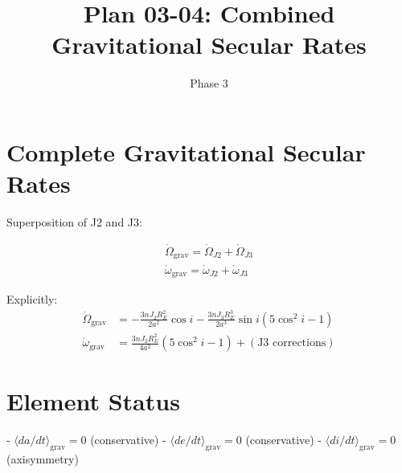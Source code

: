 \documentclass[11pt]{article}
\title{Plan 03-04: Combined Gravitational Secular Rates}
\date{Phase 3}
\begin{document}
\maketitle

\section{Complete Gravitational Secular Rates}

Superposition of J2 and J3:

\begin{align}
\boxed{\dot{\Omega}_{\text{grav}} = \dot{\Omega}_{J2} + \dot{\Omega}_{J3}}\\
\boxed{\dot{\omega}_{\text{grav}} = \dot{\omega}_{J2} + \dot{\omega}_{J3}}
\end{align}

Explicitly:
\begin{align}
\dot{\Omega}_{\text{grav}} &= -\frac{3 n J_2 R_E^2}{2 a^2}\cos i - \frac{3 n J_3 R_E^3}{2 a^3}\sin i(5\cos^2 i - 1)\\
\dot{\omega}_{\text{grav}} &= \frac{3 n J_2 R_E^2}{4 a^2}(5\cos^2 i - 1) + (\text{J3 corrections})
\end{align}

\section{Element Status}
- $\langle da/dt \rangle_{\text{grav}} = 0$ (conservative)
- $\langle de/dt \rangle_{\text{grav}} = 0$ (conservative)
- $\langle di/dt \rangle_{\text{grav}} = 0$ (axisymmetry)
\end{document}
